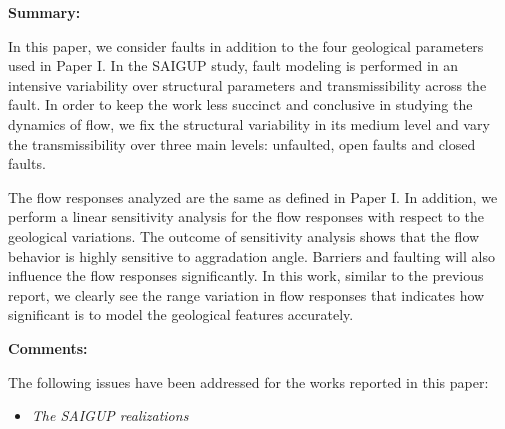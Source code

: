 {%
\textbf{Summary:} 

In this paper, we consider faults in addition to the four geological parameters
used in Paper I. In the SAIGUP study, fault modeling is performed in an
intensive variability over structural parameters and transmissibility across the
fault. In order to keep the work less succinct and conclusive in studying the
dynamics of flow, we fix the structural variability in its medium level and vary
the transmissibility over three main levels: unfaulted, open faults and closed
faults.

The flow responses analyzed are the same as
  defined in Paper I. In addition, we perform a linear sensitivity analysis for
the flow responses
with respect to the geological variations. The outcome of sensitivity analysis
shows that the flow behavior is highly sensitive to aggradation angle. Barriers
and faulting will also influence the flow responses significantly. In this
work, similar to the previous report, we clearly see the range variation in
flow responses that indicates how significant is to model the geological
features accurately. 

\vspace{0.5cm}
\noindent\textbf{Comments:} 

The following issues have been addressed for the works
reported in this paper:

\begin{itemize}

\item \textit{The SAIGUP realizations}
 
% 


\end{itemize}}
